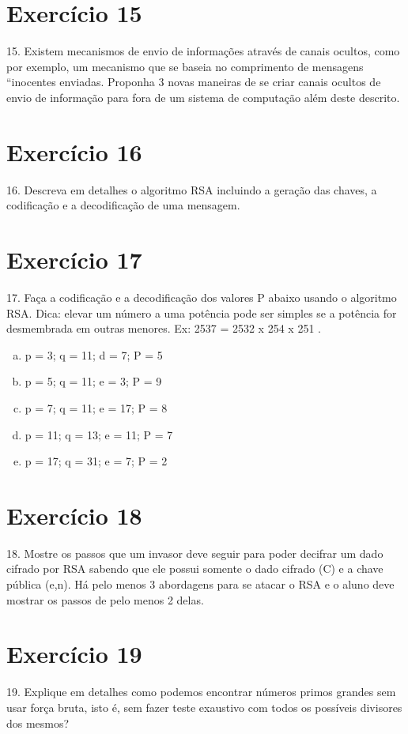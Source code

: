 \documentclass[10pt,a4paper]{article}
\begin{document}
\section*{Exercício 15}
15. Existem mecanismos de envio de informações através de canais ocultos, como por exemplo, um mecanismo que se baseia no comprimento de mensagens ``inocentes enviadas. Proponha 3 novas maneiras de se criar canais ocultos de envio de informação para fora de um sistema de computação além deste descrito.\\
\section*{Exercício 16}
16. Descreva em detalhes o algoritmo RSA incluindo a geração das chaves, a codificação e a decodificação de uma mensagem.\\
\section*{Exercício 17}
17. Faça a codificação e a decodificação dos valores P abaixo usando o algoritmo RSA. Dica: elevar um número a uma potência pode ser simples se a potência for desmembrada em outras menores. Ex: 2537 = 2532 x 254 x 251 .
\begin{enumerate}[(a)]
\item p = 3; q = 11; d = 7; P = 5\\
\item p = 5; q = 11; e = 3; P = 9\\
\item p = 7; q = 11; e = 17; P = 8\\
\item p = 11; q = 13; e = 11; P = 7\\
\item p = 17; q = 31; e = 7; P = 2\\
\end{enumerate}
\section*{Exercício 18}
18. Mostre os passos que um invasor deve seguir para poder decifrar um dado cifrado por RSA sabendo que ele possui somente o dado cifrado (C) e a chave pública (e,n). Há pelo menos 3 abordagens para se atacar o RSA e o aluno deve mostrar os passos de pelo menos 2 delas.\\
\section*{Exercício 19}
19. Explique em detalhes como podemos encontrar números primos grandes sem usar força bruta, isto é, sem fazer teste exaustivo com todos os possíveis divisores dos mesmos?\\
\end{document}
